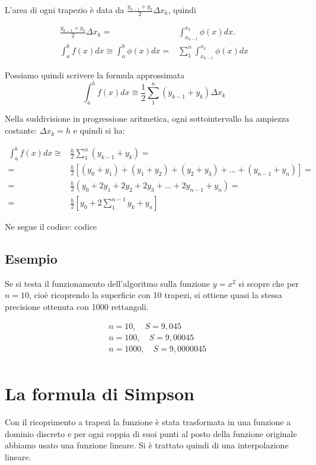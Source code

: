 \documentclass{article}
\begin{document}
L’area di ogni trapezio è data da $\frac{y_{k-1}+y_k}{2}\Delta x_k$, quindi

\begin{align*}
\frac{y_{k-1}+y_k}{2}\Delta x_k=&\int_{x_{k-1}}^{x_k}\phi(x)dx.\\
\int_a^bf(x)dx \cong \int_a^b\phi(x)dx=&\sum_1^n\int_{x_{k-1}}^{x_k}\phi(x)dx
\end{align*}

Possiamo quindi scrivere la formula approssimata
\[
\int_a^bf(x)dx\cong \frac{1}{2}\sum_1^n (y_{k-1}+y_k)\Delta x_k\]

Nella suddivisione in progressione aritmetica, ogni sottointervallo ha ampiezza costante: $\Delta x_k=h$ e quindi si ha:

\begin{align*}
\int_a^bf(x)dx\cong &\frac{h}{2}\sum_1^n (y_{k-1}+y_k)=\\
=&\frac{h}{2}[(y_0+y_1)+(y_1+y_2)+(y_2+y_3)+ ... +(y_{n-1}+y_n)]=\\
=&\frac{h}{2}(y_0+2y_1+2y_2+2y_3+ ... +2y_{n-1}+y_n)=\\
=&\frac{h}{2}\left[y_0+2\sum_1^{n-1}y_k+y_n \right]
\end{align*}

Ne segue il codice: 
codice

\subsection{Esempio}

Se si testa il funzionamento dell’algoritmo sulla funzione $y=x^2$ si scopre che per $n=10$, cioè ricoprendo la superficie con 10 trapezi, si ottiene quasi la stessa precisione ottenuta con 1000 rettangoli.

\begin{align*}
&n=10,\quad S=9,045\\
&n=100,\quad S=9,00045\\
&n=1000,\quad S=9,0000045\\
\end{align*}

\newpage
\section{La formula di Simpson}
Con il ricoprimento a trapezi la funzione è stata trasformata in una funzione a dominio discreto e per ogni coppia di suoi punti al posto della funzione originale abbiamo usato una funzione lineare. Si è trattato quindi di una interpolazione lineare.
\end{document}
